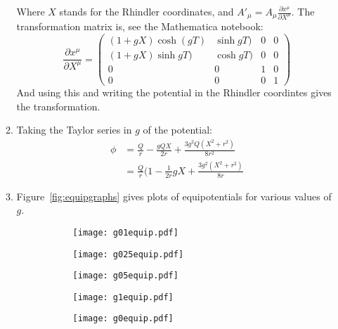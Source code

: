 \documentclass[12pt,a4]{article}
\begin{document}
\begin{enumerate}
\begin{enumerate}
        Where $X$ stands for the Rhindler coordinates, and $A'_\mu = A_\mu \frac{\partial x^\mu}{\partial X^\mu}$.
        The transformation matrix is, see the Mathematica notebook:
        \begin{equation*}
          \frac{\partial x^\mu}{\partial X^\mu}
          =
          \left(
          \begin{matrix*}
            (1+g X) \cosh(g T)&\sinh g T)&0&0\\
            (1+g X) \sinh g T)&\cosh g T)&0&0\\
            0&0&1&0\\
            0&0&0&1
          \end{matrix*}
          \right)
        \end{equation*}
        And using this and writing the potential in the Rhindler coordintes gives the transformation.
      \item
        Taking the Taylor series in $g$ of the potential:
        \begin{align*}
          \phi &= \frac{Q}{r} -\frac{g Q X}{2 r}+ \frac{3 g ^2Q (X^2+r^2) }{8 r^2}\\
               &= \frac{Q}{r}(1 -\frac{1}{2 r}gX+ \frac{3 g ^2 (X^2+r^2) }{8 r}
        \end{align*}
      \item
        Figure~\ref{fig:equipgraphs} gives plots of equipotentials for various values of $g$.
        \begin{figure}[H]
          \centering
          \begin{subfigure}[a]{.4\textwidth}
            \texttt{[image: g01equip.pdf]}
          \end{subfigure}
          \begin{subfigure}[a]{.4\textwidth}
            \texttt{[image: g025equip.pdf]}
          \end{subfigure}
          \begin{subfigure}[a]{.4\textwidth}
            \texttt{[image: g05equip.pdf]}
          \end{subfigure}
          \begin{subfigure}[a]{.4\textwidth}
            \texttt{[image: g1equip.pdf]}
          \end{subfigure}
          \begin{subfigure}[a]{.4\textwidth}
            \texttt{[image: g0equip.pdf]}
          \end{subfigure}

\end{figure}
\end{enumerate}
\end{enumerate}
\end{document}
